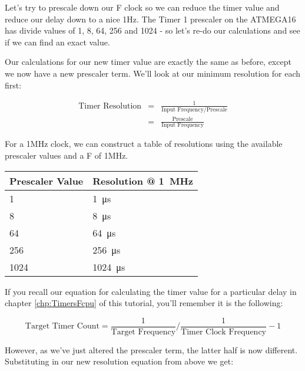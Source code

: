 \documentclass[a4paper,oneside,notitlepage]{book}
\begin{document}
Let's try to prescale down our F clock so we can reduce the timer value and reduce our delay down to a nice 1Hz. The Timer 1 prescaler on the ATMEGA16 has divide values of 1, 8, 64, 256 and 1024 - so let's re-do our calculations and see if we can find an exact value.

Our calculations for our new timer value are exactly the same as before, except we now have a new prescaler term. We'll look at our minimum resolution for each first:

\begin{displaymath}
\begin{array}{rcl}
	\text{Timer Resolution} & = & \frac{1}{\text{Input Frequency} / \text{Prescale}} \\[6pt]
	                        & = & \frac{\text{Prescale}}{\text{Input Frequency}}
\end{array}
\end{displaymath}

For a 1MHz clock, we can construct a table of resolutions using the available prescaler values and a F of 1MHz.

\begin{center}
\begin{tabular}{|l|l|}
	\hline
	Prescaler Value & Resolution @ \SI{1}{\mega\hertz} \\
	\hline
	1               & \SI{1}{\micro\second}    \\
	8               & \SI{8}{\micro\second}    \\
	64              & \SI{64}{\micro\second}   \\
	256             & \SI{256}{\micro\second}  \\
	1024            & \SI{1024}{\micro\second} \\
	\hline
\end{tabular}
\end{center}

If you recall our equation for calculating the timer value for a particular delay in chapter \ref{chp:TimersFcpu} of this tutorial, you'll remember it is the following:

\begin{displaymath}
\text{Target Timer Count} = \frac{1}{\text{Target Frequency}} / \frac{1}{\text{Timer Clock Frequency}} - 1
\end{displaymath}

However, as we've just altered the prescaler term, the latter half is now different. Substituting in our new resolution equation from above we get:
\end{document}
